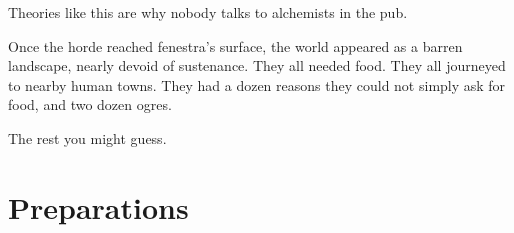 \begin{multicols}{2}
\begin{exampletext}
{  Theories like this are why nobody talks to alchemists in the pub.}


  Once the horde reached \gls{fenestra}'s surface, the world appeared as a barren landscape, nearly devoid of sustenance.
  They all needed food.
  They all journeyed to nearby human towns.
  They had a dozen reasons they could not simply ask for food, and two dozen ogres.

  The rest you might guess.

\end{exampletext}

\end{multicols}

\section{Preparations}

